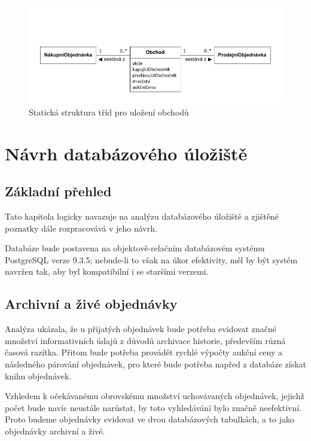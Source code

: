 \documentclass[thesis=M,czech]{FITthesis}[2012/06/26]
\begin{document}
\begin{figure}\centering
	\includegraphics[]{images/statdiagram-trade} 
	\caption[Statická struktura tříd pro uložení obchodů]{Statická struktura tříd pro uložení obchodů}\label{fig:statdiagram-trade}
\end{figure}



\chapter{Návrh databázového úložiště}


\section{Základní přehled}

Tato kapitola logicky navazuje na analýzu databázového úložiště a zjištěné poznatky dále rozpracovává v jeho návrh.

Databáze bude postavena na objektově-relačním databázovém systému PostgreSQL \cite{postgres} verze 9.3.5; nebude-li to 
však na úkor efektivity, měl by být systém navržen tak, aby byl kompatibilní i se staršími verzemi. 



\section{Archivní a živé objednávky}

Analýza ukázala, že u přijatých objednávek bude potřeba evidovat značné množství informativních údajů z důvodů archivace historie, 
především různá časová razítka. Přitom bude potřeba provádět rychlé výpočty aukční ceny a následného párování objednávek, 
pro které bude potřeba napřed z databáze získat knihu objednávek. 

Vzhledem k očekávanému obrovskému množství uchovávaných objednávek, jejichž počet bude navíc neustále narůstat, by toto 
vyhledávání bylo značně neefektivní. Proto budeme objednávky evidovat ve dvou databázových tabulkách, a to jako 
objednávky archivní a živé.
\end{document}
